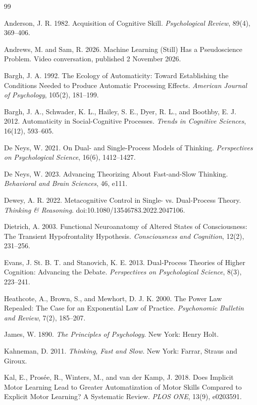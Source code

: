 \documentclass[11pt]{report}
\theoremstyle{remark}
\theoremstyle{definition}
\begin{document}
\begin{thebibliography}{99}

Anderson, J. R. 1982. Acquisition of Cognitive Skill. \emph{Psychological Review}, 89(4), 369--406.

Andrews, M. and Sam, R. 2026. Machine Learning (Still) Has a Pseudoscience Problem. Video conversation, published 2 November 2026.

Bargh, J. A. 1992. The Ecology of Automaticity: Toward Establishing the Conditions Needed to Produce Automatic Processing Effects. \emph{American Journal of Psychology}, 105(2), 181--199.

Bargh, J. A., Schwader, K. L., Hailey, S. E., Dyer, R. L., and Boothby, E. J. 2012. Automaticity in Social-Cognitive Processes. \emph{Trends in Cognitive Sciences}, 16(12), 593--605.

De Neys, W. 2021. On Dual- and Single-Process Models of Thinking. \emph{Perspectives on Psychological Science}, 16(6), 1412--1427.

De Neys, W. 2023. Advancing Theorizing About Fast-and-Slow Thinking. \emph{Behavioral and Brain Sciences}, 46, e111.

Dewey, A. R. 2022. Metacognitive Control in Single- vs. Dual-Process Theory. \emph{Thinking \& Reasoning}. doi:10.1080/13546783.2022.2047106.

Dietrich, A. 2003. Functional Neuroanatomy of Altered States of Consciousness: The Transient Hypofrontality Hypothesis. \emph{Consciousness and Cognition}, 12(2), 231--256.

Evans, J. St. B. T. and Stanovich, K. E. 2013. Dual-Process Theories of Higher Cognition: Advancing the Debate. \emph{Perspectives on Psychological Science}, 8(3), 223--241.

Heathcote, A., Brown, S., and Mewhort, D. J. K. 2000. The Power Law Repealed: The Case for an Exponential Law of Practice. \emph{Psychonomic Bulletin and Review}, 7(2), 185--207.

James, W. 1890. \emph{The Principles of Psychology}. New York: Henry Holt.

Kahneman, D. 2011. \emph{Thinking, Fast and Slow}. New York: Farrar, Straus and Giroux.

Kal, E., Prosée, R., Winters, M., and van der Kamp, J. 2018. Does Implicit Motor Learning Lead to Greater Automatization of Motor Skills Compared to Explicit Motor Learning? A Systematic Review. \emph{PLOS ONE}, 13(9), e0203591.


\end{thebibliography}
\end{document}
